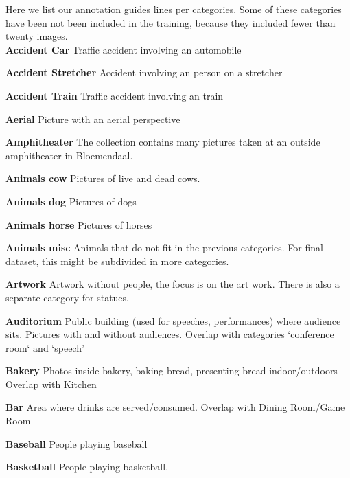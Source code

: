 \noindent Here we list our annotation guides lines per categories. Some of these categories have been not been included in the training, because they included fewer than twenty images. \\


\noindent\textbf{Accident Car} Traffic accident involving an automobile

\noindent\textbf{Accident Stretcher}
Accident involving an person on a stretcher

\noindent\textbf{Accident Train}
Traffic accident involving an train

\noindent\textbf{Aerial}
Picture with an aerial perspective


\noindent\textbf{Amphitheater}
The collection contains many pictures taken at an outside amphitheater in Bloemendaal. 

\noindent\textbf{Animals cow}
Pictures of live and dead cows.

\noindent\textbf{Animals dog}
Pictures of dogs

\noindent\textbf{Animals horse}
Pictures of horses

\noindent\textbf{Animals misc}
Animals that do not fit in the previous categories. For final dataset, this might be subdivided in more categories.

\noindent\textbf{Artwork}
Artwork without people, the focus is on the art work.
There is also a separate category for statues. 

\noindent\textbf{Auditorium}
Public building (used for speeches, performances) where audience sits. Pictures with and without audiences. Overlap with categories `conference room` and `speech'


\noindent\textbf{Bakery}
Photos inside bakery, baking bread, presenting bread indoor/outdoors
Overlap with Kitchen

\noindent\textbf{Bar}
Area where drinks are served/consumed. Overlap with Dining Room/Game Room

\noindent\textbf{Baseball}
People playing baseball


\noindent\textbf{Basketball}
People playing basketball. 

